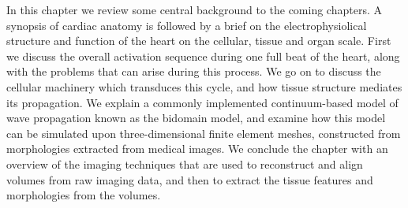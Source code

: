 In this chapter we review some central background to the coming chapters. A synopsis of cardiac anatomy is followed by a brief on the electrophysiolical structure and function of the heart on the cellular, tissue and organ scale. First we discuss the overall activation sequence during one full beat of the heart, along with the problems that can arise during this process. We go on to discuss the cellular machinery which transduces this cycle, and how tissue structure mediates its propagation. We explain a commonly implemented continuum-based model of wave propagation known as the bidomain model, and examine how this model can be simulated upon three-dimensional finite element meshes, constructed from morphologies extracted from medical images. We conclude the chapter with an overview of the imaging techniques that are used to reconstruct and align volumes from raw imaging data, and then to extract the tissue features and morphologies from the volumes.